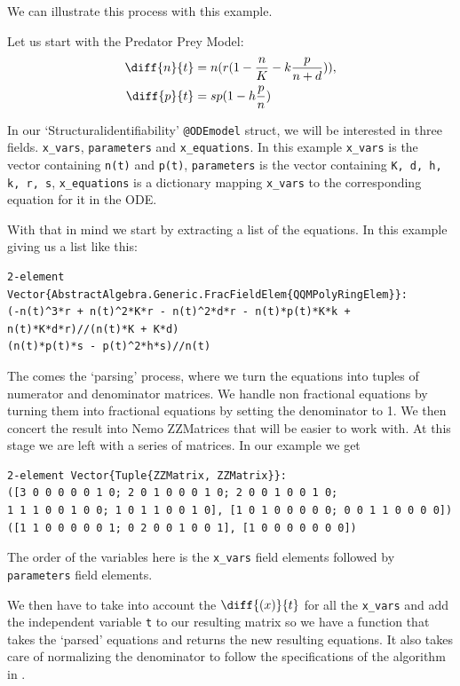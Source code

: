 \documentclass[oneside, a4paper, onecolumn, 11pt]{article}
\begin{document}
We can illustrate this process with this example.

Let us start with the Predator Prey Model:
\begin{align*}
    \diff{n}{t}
     & = n (r (1 - \frac{n}{K} - k \frac{p}{n + d})), \\
    \diff{p}{t}
     & = sp (1 - h \frac{p}{n})
\end{align*}

In our `Structuralidentifiability' \texttt{@ODEmodel} struct, we will be interested in three fields. \texttt{x\_vars}, \texttt{parameters} and \texttt{x\_equations}. In this example \texttt{x\_vars} is the vector containing \texttt{n(t)} and \texttt{p(t)}, \texttt{parameters} is the vector containing \texttt{K, d, h, k, r, s}, \texttt{x\_equations} is a dictionary mapping \texttt{x\_vars} to the corresponding equation for it in the ODE.

With that in mind we start by extracting a list of the equations. In this example giving us a list like this:
\begin{lstlisting}
2-element Vector{AbstractAlgebra.Generic.FracFieldElem{QQMPolyRingElem}}:
(-n(t)^3*r + n(t)^2*K*r - n(t)^2*d*r - n(t)*p(t)*K*k + n(t)*K*d*r)//(n(t)*K + K*d)
(n(t)*p(t)*s - p(t)^2*h*s)//n(t)
\end{lstlisting}

The comes the `parsing' process, where we turn the equations into tuples of numerator and denominator matrices. We handle non fractional equations by turning them into fractional equations by setting the denominator to 1. We then concert the result into Nemo ZZMatrices that will be easier to work with. At this stage we are left with a series of matrices. In our example we get
\begin{lstlisting}
2-element Vector{Tuple{ZZMatrix, ZZMatrix}}:
([3 0 0 0 0 0 1 0; 2 0 1 0 0 0 1 0; 2 0 0 1 0 0 1 0;
1 1 1 0 0 1 0 0; 1 0 1 1 0 0 1 0], [1 0 1 0 0 0 0 0; 0 0 1 1 0 0 0 0])
([1 1 0 0 0 0 0 1; 0 2 0 0 1 0 0 1], [1 0 0 0 0 0 0 0])
\end{lstlisting}

The order of the variables here is the \texttt{x\_vars} field elements followed by \texttt{parameters} field elements.

We then have to take into account the \(\diff{(x)}{t}\) for all the \texttt{x\_vars} and add the independent variable \texttt{t} to our resulting matrix so we have a function that takes the `parsed' equations and returns the new resulting equations. It also takes care of normalizing the denominator to follow the specifications of the algorithm in \cite{Hubert2013}.
\end{document}
